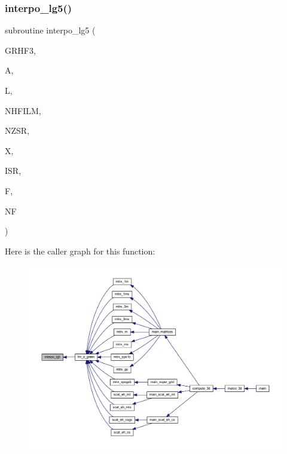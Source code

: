 \subsubsection{\texorpdfstring{interpo\+\_\+lg5()}{interpo\_lg5()}}
{\footnotesize\ttfamily subroutine interpo\+\_\+lg5 (\begin{DoxyParamCaption}\item[{complex, dimension(11,nhfilm,nzsr)}]{G\+R\+H\+F3,  }\item[{real, dimension(l)}]{A,  }\item[{integer}]{L,  }\item[{integer}]{N\+H\+F\+I\+LM,  }\item[{integer}]{N\+Z\+SR,  }\item[{real}]{X,  }\item[{integer}]{I\+SR,  }\item[{complex, dimension(nf)}]{F,  }\item[{integer}]{NF }\end{DoxyParamCaption})}

Here is the caller graph for this function\+:
\nopagebreak
\begin{figure}[H]
\begin{center}
\leavevmode
\includegraphics[width=350pt]{Marco_8f90_a1715ef788d21f1b4a8008fdf5f53bfc2_icgraph}
\end{center}
\end{figure}
\mbox{\label{Marco_8f90_a5fa32081a6f961179118c3eed68de85f}} 
